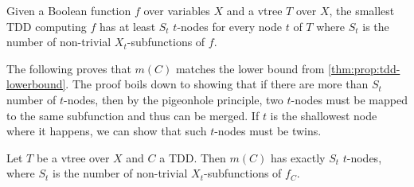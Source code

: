 \documentclass[a4paper,UKenglish,cleveref, autoref, thm-restate]{lipics-v2021}
\begin{document}
\begin{theorem}
  \label{thm:prop:tdd-lowerbound} Given a Boolean function $f$ over variables $X$ and a vtree $T$ over $X$, the smallest TDD computing $f$ has at least $S_t$ $t$-nodes for every node $t$ of $T$ where $S_t$ is the number of non-trivial $X_t$-subfunctions of $f$.
\end{theorem}

The following proves that $m(C)$ matches the lower bound from \cref{thm:prop:tdd-lowerbound}. The proof boils down to showing that if there are more than $S_t$ number of $t$-nodes, then by the pigeonhole principle, two $t$-nodes must be mapped to the same subfunction and thus can be merged. If $t$ is the shallowest node where it happens, we can show that such $t$-nodes must be twins.

\begin{theorem}[$\star$]
  \label{thm:prop:tdd-min} Let $T$ be a vtree over $X$ and $C$ a TDD. Then $m(C)$ has exactly $S_t$ $t$-nodes, where $S_t$ is the number of non-trivial $X_t$-subfunctions of $f_C$. 
\end{theorem}
\end{document}

